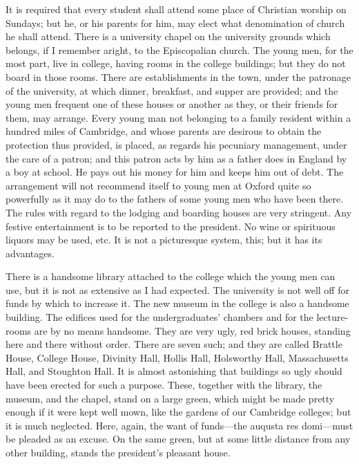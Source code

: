 It is required that every student shall attend some place of
Christian worship on Sundays; but he, or his parents for him, may
elect what denomination of church he shall attend.  There is a
university chapel on the university grounds which belongs, if I
remember aright, to the Episcopalian church.  The young men, for
the most part, live in college, having rooms in the college
buildings; but they do not board in those rooms.  There are
establishments in the town, under the patronage of the university,
at which dinner, breakfast, and supper are provided; and the young
men frequent one of these houses or another as they, or their
friends for them, may arrange.  Every young man not belonging to a
family resident within a hundred miles of Cambridge, and whose
parents are desirous to obtain the protection thus provided, is
placed, as regards his pecuniary management, under the care of a
patron; and this patron acts by him as a father does in England by
a boy at school.  He pays out his money for him and keeps him out
of debt.  The arrangement will not recommend itself to young men at
Oxford quite so powerfully as it may do to the fathers of some
young men who have been there.  The rules with regard to the
lodging and boarding houses are very stringent.  Any festive
entertainment is to be reported to the president.  No wine or
spirituous liquors may be used, etc.  It is not a picturesque
system, this; but it has its advantages.

There is a handsome library attached to the college which the young
men can use, but it is not as extensive as I had expected.  The
university is not well off for funds by which to increase it.  The
new museum in the college is also a handsome building.  The
edifices used for the undergraduates' chambers and for the lecture-
rooms are by no means handsome.  They are very ugly, red brick
houses, standing here and there without order.  There are seven
such; and they are called Brattle House, College House, Divinity
Hall, Hollis Hall, Holsworthy Hall, Massachusetts Hall, and
Stoughton Hall.  It is almost astonishing that buildings so ugly
should have been erected for such a purpose.  These, together with
the library, the museum, and the chapel, stand on a large green,
which might be made pretty enough if it were kept well mown, like
the gardens of our Cambridge colleges; but it is much neglected.
Here, again, the want of funds---the auqusta res domi---must be
pleaded as an excuse.  On the same green, but at some little
distance from any other building, stands the president's pleasant
house.

